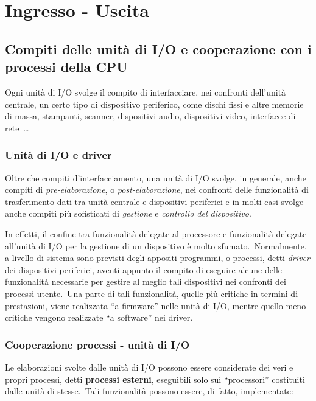 \chapter{Ingresso - Uscita}

\section{Compiti delle unità di I/O e cooperazione con i processi della CPU}

Ogni unità di I/O svolge il compito di interfacciare, nei confronti dell'unità centrale, un certo tipo di dispositivo periferico, come dischi fissi e altre memorie di massa, stampanti, scanner, dispositivi audio, dispositivi video, interfacce di rete\ \dots

\subsection{Unità di I/O e driver}

Oltre che compiti d'interfacciamento, una unità di I/O svolge, in generale, anche compiti di \textit{pre-elaborazione}, o \textit{post-elaborazione}, nei confronti delle funzionalità di trasferimento dati tra unità centrale e dispositivi periferici e in molti casi svolge anche compiti più sofisticati di \textit{gestione} e \textit{controllo del dispositivo}.

In effetti, il confine tra funzionalità delegate al processore e funzionalità delegate all'unità di I/O per la gestione di un dispositivo è molto sfumato.\
Normalmente, a livello di sistema sono previsti degli appositi programmi, o processi, detti \textit{driver} dei dispositivi periferici, aventi appunto il compito di eseguire alcune delle funzionalità necessarie per gestire al meglio tali dispositivi nei confronti dei processi utente.\
Una parte di tali funzionalità, quelle più critiche in termini di prestazioni, viene realizzata ``a firmware'' nelle unità di  I/O, mentre quello meno critiche vengono realizzate ``a software'' nei driver.

\subsection{Cooperazione processi - unità di I/O}

Le elaborazioni svolte dalle unità di I/O possono essere considerate dei veri e propri processi, detti \textbf{processi esterni}, eseguibili solo sui ``processori'' costituiti dalle unità di stesse.\
Tali funzionalità possono essere, di fatto, implementate:

